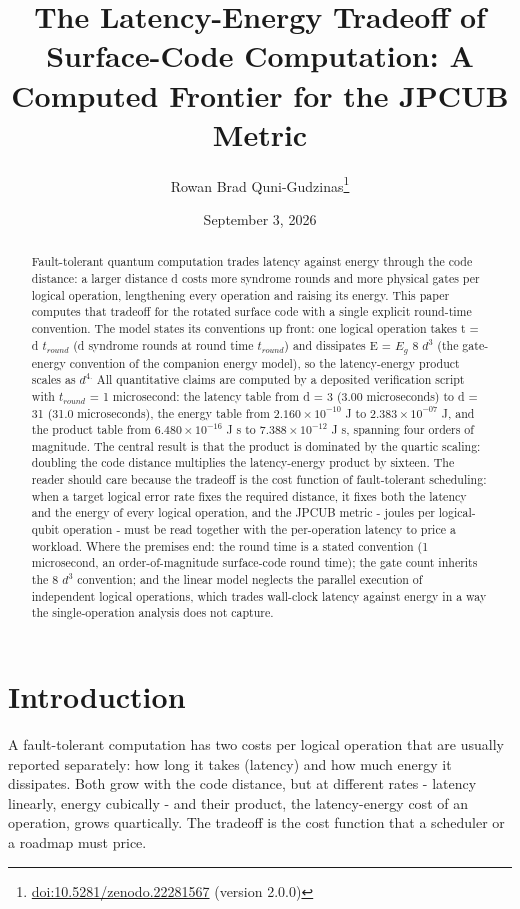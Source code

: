 \documentclass[11pt]{article}
\title{The Latency-Energy Tradeoff of Surface-Code Computation: A Computed Frontier for the JPCUB Metric}
\author{Rowan Brad Quni-Gudzinas\thanks{\href{https://doi.org/10.5281/zenodo.22281567}{doi:10.5281/zenodo.22281567} (version 2.0.0)}}
\date{September 3, 2026}
\begin{document}
\maketitle
\begin{abstract}
Fault-tolerant quantum computation trades latency against energy through the code distance: a larger distance d costs more syndrome rounds and more physical gates per logical operation, lengthening every operation and raising its energy. This paper computes that tradeoff for the rotated surface code with a single explicit round-time convention. The model states its conventions up front: one logical operation takes t = d $t_{round}$ (d syndrome rounds at round time $t_{round}$) and dissipates E = $E_{g}$ 8 $d^{3}$ (the gate-energy convention of the companion energy model), so the latency-energy product scales as $d^{4.}$ All quantitative claims are computed by a deposited verification script with $t_{round}$ = 1 microsecond: the latency table from d = 3 (3.00 microseconds) to d = 31 (31.0 microseconds), the energy table from $2.160\times 10^{-10}$ J to $2.383\times 10^{-07}$ J, and the product table from $6.480\times 10^{-16}$ J s to $7.388\times 10^{-12}$ J s, spanning four orders of magnitude. The central result is that the product is dominated by the quartic scaling: doubling the code distance multiplies the latency-energy product by sixteen. The reader should care because the tradeoff is the cost function of fault-tolerant scheduling: when a target logical error rate fixes the required distance, it fixes both the latency and the energy of every logical operation, and the JPCUB metric - joules per logical-qubit operation - must be read together with the per-operation latency to price a workload. Where the premises end: the round time is a stated convention (1 microsecond, an order-of-magnitude surface-code round time); the gate count inherits the 8 $d^{3}$ convention; and the linear model neglects the parallel execution of independent logical operations, which trades wall-clock latency against energy in a way the single-operation analysis does not capture.
\end{abstract}
\section{Introduction}
A fault-tolerant computation has two costs per logical operation that are usually reported separately: how long it takes (latency) and how much energy it dissipates. Both grow with the code distance, but at different rates - latency linearly, energy cubically - and their product, the latency-energy cost of an operation, grows quartically. The tradeoff is the cost function that a scheduler or a roadmap must price.
\end{document}
